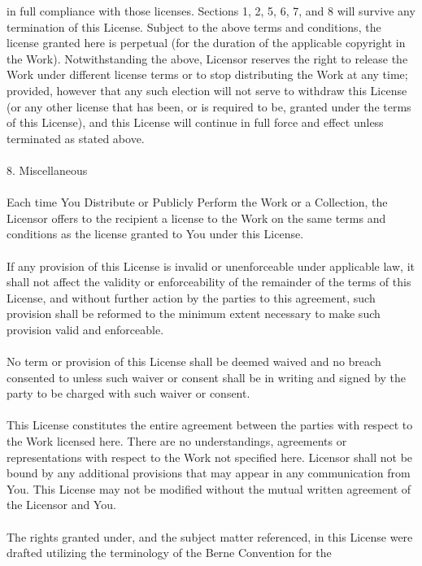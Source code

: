     in full compliance with those licenses. Sections 1, 2, 5, 6, 7, and 8 will
    survive any termination of this License.
    Subject to the above terms and conditions, the license granted here is
    perpetual (for the duration of the applicable copyright in the Work).
    Notwithstanding the above, Licensor reserves the right to release the Work
    under different license terms or to stop distributing the Work at any time;
    provided, however that any such election will not serve to withdraw this
    License (or any other license that has been, or is required to be, granted
    under the terms of this License), and this License will continue in full
    force and effect unless terminated as stated above.
\\ \\
8. Miscellaneous \\ \\
    Each time You Distribute or Publicly Perform the Work or a Collection, the
    Licensor offers to the recipient a license to the Work on the same terms and
    conditions as the license granted to You under this License.
    \\ \\
    If any provision of this License is invalid or unenforceable under
    applicable law, it shall not affect the validity or enforceability of the
    remainder of the terms of this License, and without further action by the
    parties to this agreement, such provision shall be reformed to the minimum
    extent necessary to make such provision valid and enforceable.
    \\ \\
    No term or provision of this License shall be deemed waived and no breach
    consented to unless such waiver or consent shall be in writing and signed by
    the party to be charged with such waiver or consent.
    \\ \\
    This License constitutes the entire agreement between the parties with
    respect to the Work licensed here. There are no understandings, agreements
    or representations with respect to the Work not specified here. Licensor
    shall not be bound by any additional provisions that may appear in any
    communication from You. This License may not be modified without the mutual
    written agreement of the Licensor and You.
    \\ \\
    The rights granted under, and the subject matter referenced, in this License
    were drafted utilizing the terminology of the Berne Convention for the
